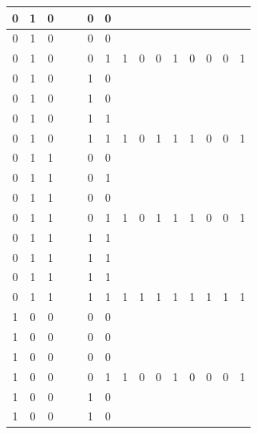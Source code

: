 \begin{table}[!tb]
\begin{tabular}{|c|c|c|c|c|c|c|c|c|c|c|c|c|c|c|}
        \rowcolor{yellow!40} 0 & 1 & 0 &  &  & 0 & 0 &  &  &  &  &  &  &  &  \\ \hline
        \rowcolor{yellow!40} 0 & 1 & 0 &  &  & 0 & 0 &  &  &  &  &  &  &  &  \\ \hline
        \rowcolor{yellow!40} 0 & 1 & 0 &  &  & 0 & 1 & 1 & 0 & 0 & 1 & 0 & 0 & 0 & 1 \\ \hline
        \rowcolor{gray!40} 0 & 1 & 0 &  &  & 1 & 0 &  &  &  &  &  &  &  &  \\ \hline
        \rowcolor{gray!40} 0 & 1 & 0 &  &  & 1 & 0 &  &  &  &  &  &  &  &  \\ \hline
        \rowcolor{gray!40} 0 & 1 & 0 &  &  & 1 & 1 &  &  &  &  &  &  &  &  \\ \hline
        \rowcolor{gray!40} 0 & 1 & 0 &  &  & 1 & 1 & 1 & 0 & 1 & 1 & 1 & 0 & 0 & 1 \\ \hline
        \rowcolor{blue!40} 0 & 1 & 1 &  &  & 0 & 0 &  &  &  &  &  &  &  &  \\ \hline
        \rowcolor{blue!40} 0 & 1 & 1 &  &  & 0 & 1 &  &  &  &  &  &  &  &  \\ \hline
        \rowcolor{blue!40} 0 & 1 & 1 &  &  & 0 & 0 &  &  &  &  &  &  &  &  \\ \hline
        \rowcolor{blue!40} 0 & 1 & 1 &  &  & 0 & 1 & 1 & 0 & 1 & 1 & 1 & 0 & 0 & 1 \\ \hline
        \rowcolor{red!40} 0 & 1 & 1 &  &  & 1 & 1 &  &  &  &  &  &  &  &  \\ \hline
        \rowcolor{red!40} 0 & 1 & 1 &  &  & 1 & 1 &  &  &  &  &  &  &  &  \\ \hline
        \rowcolor{red!40} 0 & 1 & 1 &  &  & 1 & 1 &  &  &  &  &  &  &  &  \\ \hline
        \rowcolor{red!40} 0 & 1 & 1 &  &  & 1 & 1 & 1 & 1 & 1 & 1 & 1 & 1 & 1 & 1 \\ \hline
        \rowcolor{green!40} 1 & 0 & 0 &  &  & 0 & 0 &  &  &  &  &  &  &  &  \\ \hline
        \rowcolor{green!40} 1 & 0 & 0 &  &  & 0 & 0 &  &  &  &  &  &  &  &  \\ \hline
        \rowcolor{green!40} 1 & 0 & 0 &  &  & 0 & 0 &  &  &  &  &  &  &  &  \\ \hline
        \rowcolor{green!40} 1 & 0 & 0 &  &  & 0 & 1 & 1 & 0 & 0 & 1 & 0 & 0 & 0 & 1 \\ \hline
        \rowcolor{yellow!40} 1 & 0 & 0 &  &  & 1 & 0 &  &  &  &  &  &  &  &  \\ \hline
        \rowcolor{yellow!40} 1 & 0 & 0 &  &  & 1 & 0 &  &  &  &  &  &  &  &  \\ \hline

\end{tabular}
\end{table}
